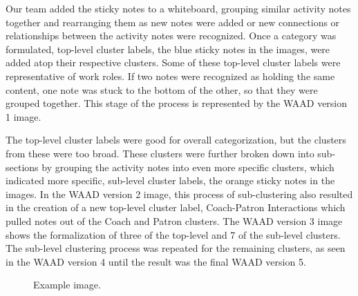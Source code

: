 \documentclass[12pt]{article} %
\begin{document}
Our team added the sticky notes to a whiteboard, grouping similar activity notes together and rearranging them as new notes were added or new connections or relationships between the activity notes were recognized.  Once a category was formulated, top-level cluster labels, the blue sticky notes in the images, were added atop their respective clusters.  Some of these top-level cluster labels were representative of work roles.  If two notes were recognized as holding the same content, one note was stuck to the bottom of the other, so that they were grouped together.  This stage of the process is represented by the WAAD version 1 image. 

The top-level cluster labels were good for overall categorization, but the clusters from these were too broad.  These clusters were further broken down into sub-sections by grouping the activity notes into even more specific clusters, which indicated more specific, sub-level cluster labels, the orange sticky notes in the images.  In the WAAD version 2 image, this process of sub-clustering also resulted in the creation of a new top-level cluster label, Coach-Patron Interactions which pulled notes out of the Coach and Patron clusters.   The WAAD version 3 image shows the formalization of three of the top-level and 7 of the sub-level clusters.  The sub-level clustering process was repeated for the remaining clusters, as seen in the WAAD version 4 until the result was the final WAAD version 5.
\begin{figure}[H] %
\caption{Example image.}
\label{fig:speciation}
\end{figure}

\end{document}
